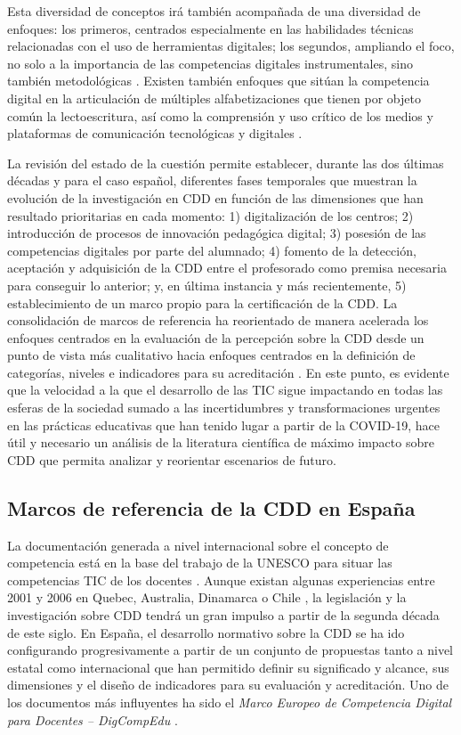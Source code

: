 \documentclass[spanish]{textolivre}
\begin{document}
Esta diversidad de conceptos irá también acompañada de una diversidad de enfoques: los primeros, centrados especialmente en las habilidades técnicas relacionadas con el uso de herramientas digitales; los segundos, ampliando el foco, no solo a la importancia de las competencias digitales instrumentales, sino también metodológicas \cite{barragan2021, generalitat2018}. Existen también enfoques que sitúan la competencia digital en la articulación de múltiples alfabetizaciones que tienen por objeto común la lectoescritura, así como la comprensión y uso crítico de los medios y plataformas de comunicación tecnológicas y digitales \cite{buckingham2020}.

La revisión del estado de la cuestión permite establecer, durante las dos últimas décadas y para el caso español, diferentes fases temporales que muestran la evolución de la investigación en CDD en función de las dimensiones que han resultado prioritarias en cada momento: 1) digitalización de los centros; 2) introducción de procesos de innovación pedagógica digital; 3) posesión de las competencias digitales por parte del alumnado; 4) fomento de la detección, aceptación y adquisición de la CDD entre el profesorado como premisa necesaria para conseguir lo anterior; y, en última instancia y más recientemente, 5) establecimiento de un marco propio para la certificación de la CDD. La consolidación de marcos de referencia ha reorientado de manera acelerada los enfoques centrados en la evaluación de la percepción sobre la CDD desde un punto de vista más cualitativo hacia enfoques centrados en la definición de categorías, niveles e indicadores para su acreditación \cite{caberoalmenara-palacios2020}. En este punto, es evidente que la velocidad a la que el desarrollo de las TIC sigue impactando en todas las esferas de la sociedad sumado a las incertidumbres y transformaciones urgentes en las prácticas educativas que han tenido lugar a partir de la COVID-19, hace útil y necesario un análisis de la literatura científica de máximo impacto sobre CDD que permita analizar y reorientar escenarios de futuro.

\subsection{Marcos de referencia de la CDD en España}\label{sec-1.2}
La documentación generada a nivel internacional sobre el concepto de competencia \cite{ocde2005, comisioneuropea2006} está en la base del trabajo de la UNESCO para situar las competencias TIC de los docentes \cite{unesco2008, unesco2018}. Aunque existan algunas experiencias entre 2001 y 2006 en Quebec, Australia, Dinamarca o Chile \cite{carrera2012}, la legislación y la investigación sobre CDD tendrá un gran impulso a partir de la segunda década de este siglo. En España, el desarrollo normativo sobre la CDD se ha ido configurando progresivamente a partir de un conjunto de propuestas tanto a nivel estatal como internacional \cite{caberoalmenara-palacios2020, lazaro2019} que han permitido definir su significado y alcance, sus dimensiones y el diseño de indicadores para su evaluación y acreditación. Uno de los documentos más influyentes ha sido el \textit{Marco Europeo de Competencia Digital para Docentes -- DigCompEdu} \cite{caberoalmenaraetal2020, redecker2017}.
\end{document}

